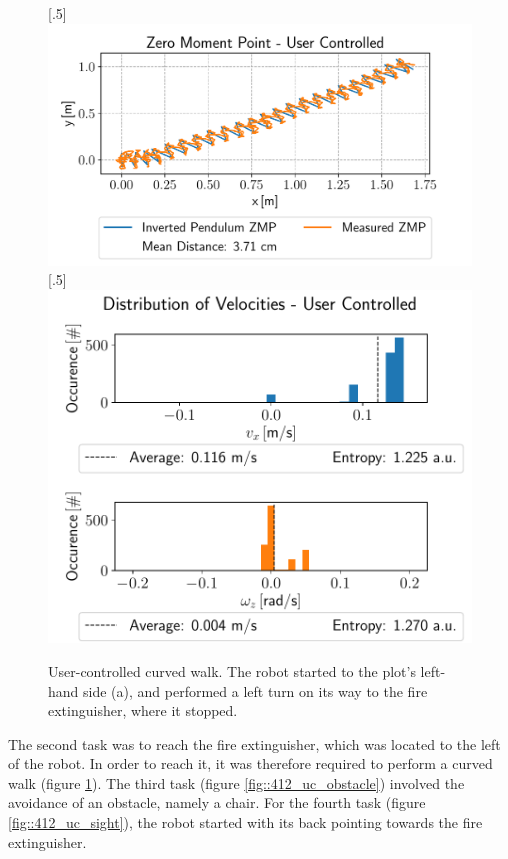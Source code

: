 \begin{figure}[h!]
	[.5\linewidth]{\includegraphics[scale=.45]{chapters/04_experiments/01_user_controlled_walking/02_test_environment/curved_walk_01_zmp.pdf}}
	[.5\linewidth]{\includegraphics[scale=.45]{chapters/04_experiments/01_user_controlled_walking/02_test_environment/curved_walk_01_entropy.pdf}}
	\caption{User-controlled curved walk. The robot started to the plot's left-hand side (a), and performed a left turn on its way to the fire extinguisher, where it stopped.}
	\label{fig::412_uc_curved}
\end{figure} 
The second task was to reach the fire extinguisher, which was located to the left of the robot. In order to reach it, it was therefore required to perform a curved walk (figure \ref{fig::412_uc_curved}). The third task (figure \ref{fig::412_uc_obstacle}) involved the avoidance of an obstacle, namely a chair. For the fourth task (figure \ref{fig::412_uc_sight}), the robot started with its back pointing towards the fire extinguisher.
